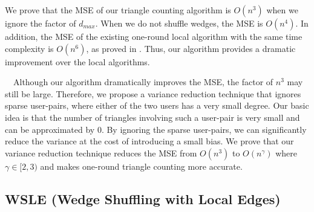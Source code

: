 We prove that the MSE of our triangle counting algorithm is
$O(n^3)$ when we ignore the factor of $d_{max}$.
When we do not shuffle wedges, the
MSE is
$O(n^4)$.
In addition, the MSE of the existing one-round local algorithm \cite{Imola_USENIX22} with the same time complexity is $O(n^6)$, as proved in
.
Thus, our
algorithm
provides a dramatic improvement over the local algorithms.

\smallskip
{}~~Although our
algorithm
dramatically
improves
the MSE, the factor of $n^3$ may still be large.
Therefore, we propose a variance reduction technique that ignores sparse user-pairs, where either of the two users has a very small degree.
Our basic idea is that the number of triangles involving such a user-pair is very small
and can be approximated by $0$.
By ignoring the sparse user-pairs, we can significantly reduce the variance at the cost of introducing a small bias.
We prove that our variance reduction technique reduces the MSE from $O(n^3)$ to $O(n^\gamma)$ where $\gamma\in[2,3)$ and makes one-round triangle counting more accurate.


\subsection{WSLE (Wedge Shuffling with Local Edges)}
\label{sub:wedge}

